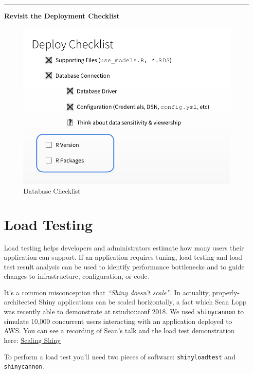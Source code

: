 \documentclass[]{book}
\theoremstyle{definition}
\theoremstyle{definition}
\theoremstyle{definition}
\theoremstyle{remark}
\begin{document}
\begin{center}\rule{0.5\linewidth}{\linethickness}\end{center}

\textbf{Revisit the Deployment Checklist}

\begin{figure}
\centering
\includegraphics{imgs/databases/database-checklist.png}
\caption{Database Checklist}
\end{figure}

\hypertarget{load-testing}{%
\chapter{Load Testing}\label{load-testing}}

Load testing helps developers and administrators estimate how many users
their application can support. If an application requires tuning, load
testing and load test result analysis can be used to identify
performance bottlenecks and to guide changes to infrastructure,
configuration, or code.

It's a common misconception that \emph{``Shiny doesn't scale''}. In
actuality, properly-architected Shiny applications can be scaled
horizontally, a fact which Sean Lopp was recently able to demonstrate at
rstudio::conf 2018. We used \texttt{shinycannon} to simulate 10,000
concurrent users interacting with an application deployed to AWS. You
can see a recording of Sean's talk and the load test demonstration here:
\href{https://www.rstudio.com/resources/videos/scaling-shiny/}{Scaling
Shiny}

To perform a load test you'll need two pieces of software:
\texttt{shinyloadtest} and \texttt{shinycannon}.
\end{document}
